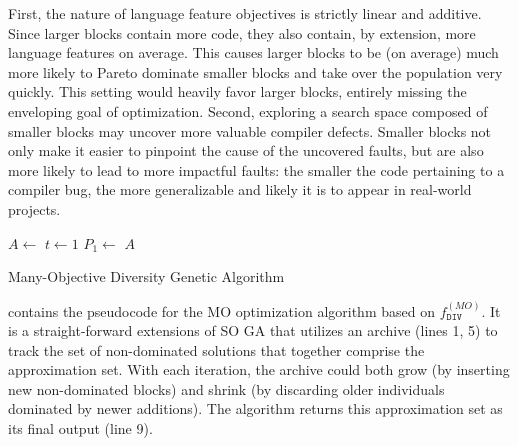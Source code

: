 First, the nature of language feature objectives is strictly linear and additive.
Since larger blocks contain more code, they also contain, by extension, more
language features on average.
This causes larger blocks to be (on average) much more likely
to Pareto dominate smaller blocks and take over the population very quickly.
This setting would heavily favor larger blocks, entirely missing
the enveloping goal of optimization.
Second, exploring a search space composed of smaller blocks may uncover
more valuable compiler defects.
Smaller blocks not only make it easier to pinpoint the cause of the
uncovered faults, but are also more likely to lead to
more impactful faults: the smaller the code pertaining to a compiler bug,
the more generalizable and likely it is to appear in real-world projects.

\begin{algorithm}[t]

	\BlankLine
	\DontPrintSemicolon
	$A \leftarrow$ \;
	$t \leftarrow 1$\;
	$P_1 \leftarrow $ \;
	\Return $A$\;
	\caption{Many-Objective Diversity Genetic Algorithm}
	\label{alg:modga}
\end{algorithm}

 contains the pseudocode for the \gls{MO} optimization
algorithm based on $f^{(MO)}_{\texttt{DIV}}$.
It is a straight-forward extensions of \gls{SO} \gls{GA} that utilizes
an archive (lines 1, 5) to track the set of non-dominated solutions
that together comprise the approximation set.
With each iteration, the archive could both grow (by inserting new non-dominated
blocks) and shrink (by discarding older individuals dominated by newer additions).
The algorithm returns this approximation set as its final output (line 9).

